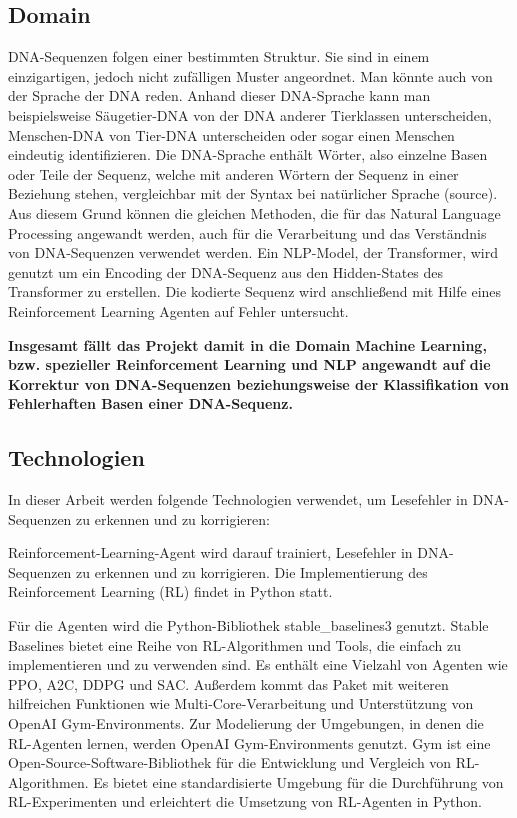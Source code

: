 \documentclass[oneside,bibliography=totocnumbered,BCOR=5mm]{scrbook}%
\theoremstyle{definition}
\theoremstyle{definition}
\theoremstyle{definition}
\theoremstyle{definition}
\theoremstyle{definition}
\theoremstyle{definition}
\begin{document}
\subsection{Domain} 

DNA-Sequenzen folgen einer bestimmten Struktur. Sie sind in einem einzigartigen, jedoch nicht zufälligen Muster angeordnet. 
Man könnte auch von der Sprache der DNA reden. 
Anhand dieser DNA-Sprache kann man beispielsweise Säugetier-DNA von der DNA anderer Tierklassen unterscheiden, 
Menschen-DNA von Tier-DNA unterscheiden oder sogar einen Menschen eindeutig identifizieren.
Die DNA-Sprache enthält Wörter, also einzelne Basen oder Teile der Sequenz, welche mit anderen Wörtern der Sequenz in einer Beziehung stehen, vergleichbar mit der Syntax bei natürlicher Sprache (source).
Aus diesem Grund können die gleichen Methoden, die für das Natural Language Processing angewandt werden, auch für die Verarbeitung und das Verständnis von DNA-Sequenzen verwendet werden.
Ein NLP-Model, der Transformer, wird genutzt um ein Encoding der DNA-Sequenz aus den Hidden-States des Transformer zu erstellen. 
Die kodierte Sequenz wird anschließend mit Hilfe eines Reinforcement Learning Agenten auf Fehler untersucht. 


\textbf{Insgesamt fällt das Projekt damit in die Domain Machine Learning, bzw. spezieller Reinforcement Learning und NLP angewandt 
auf die Korrektur von DNA-Sequenzen beziehungsweise der Klassifikation von Fehlerhaften Basen einer DNA-Sequenz.}



\subsection{Technologien}
In dieser Arbeit werden folgende Technologien verwendet, 
um Lesefehler in DNA-Sequenzen zu erkennen und zu korrigieren:


Reinforcement-Learning-Agent wird darauf trainiert, Lesefehler in DNA-Sequenzen zu erkennen und zu korrigieren. 
Die Implementierung des Reinforcement Learning (RL) findet in Python statt. 


Für die Agenten wird die Python-Bibliothek stable\_baselines3 genutzt. 
Stable Baselines bietet eine Reihe von RL-Algorithmen und Tools, die einfach zu implementieren und zu verwenden sind. 
Es enthält eine Vielzahl von Agenten wie PPO, A2C, DDPG und SAC. 
Außerdem kommt das Paket mit weiteren hilfreichen Funktionen wie Multi-Core-Verarbeitung und
Unterstützung von OpenAI Gym-Environments.
Zur Modelierung der Umgebungen, in denen die RL-Agenten lernen, werden OpenAI Gym-Environments genutzt. 
Gym ist eine Open-Source-Software-Bibliothek für die Entwicklung und Vergleich von RL-Algorithmen. 
Es bietet eine standardisierte Umgebung für die Durchführung von RL-Experimenten und 
erleichtert die Umsetzung von RL-Agenten in Python.
\end{document}
